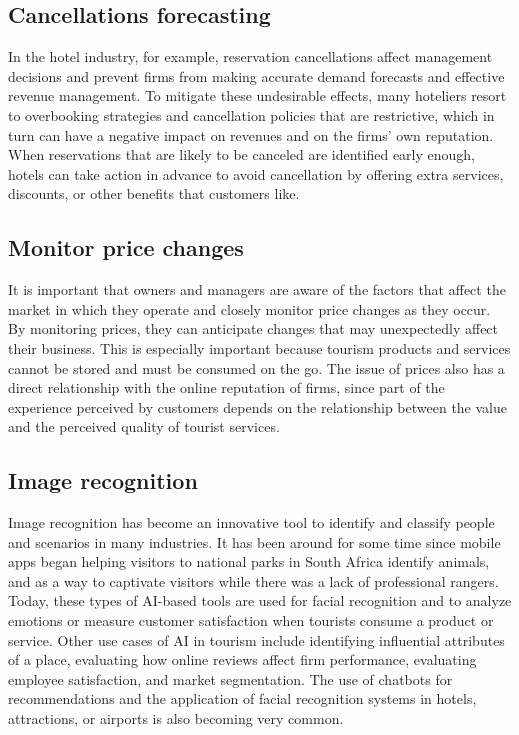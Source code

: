 \documentclass[
  letterpaper,
  DIV=11,
  numbers=noendperiod]{scrreprt}
\begin{document}
\hypertarget{cancellations-forecasting}{%
\subsection{Cancellations forecasting}\label{cancellations-forecasting}}

In the hotel industry, for example, reservation cancellations affect
management decisions and prevent firms from making accurate demand
forecasts and effective revenue management. To mitigate these
undesirable effects, many hoteliers resort to overbooking strategies and
cancellation policies that are restrictive, which in turn can have a
negative impact on revenues and on the firms' own reputation. When
reservations that are likely to be canceled are identified early enough,
hotels can take action in advance to avoid cancellation by offering
extra services, discounts, or other benefits that customers like.

\hypertarget{monitor-price-changes}{%
\subsection{Monitor price changes}\label{monitor-price-changes}}

It is important that owners and managers are aware of the factors that
affect the market in which they operate and closely monitor price
changes as they occur. By monitoring prices, they can anticipate changes
that may unexpectedly affect their business. This is especially
important because tourism products and services cannot be stored and
must be consumed on the go. The issue of prices also has a direct
relationship with the online reputation of firms, since part of the
experience perceived by customers depends on the relationship between
the value and the perceived quality of tourist services.

\hypertarget{image-recognition}{%
\subsection{Image recognition}\label{image-recognition}}

Image recognition has become an innovative tool to identify and classify
people and scenarios in many industries. It has been around for some
time since mobile apps began helping visitors to national parks in South
Africa identify animals, and as a way to captivate visitors while there
was a lack of professional rangers. Today, these types of AI-based tools
are used for facial recognition and to analyze emotions or measure
customer satisfaction when tourists consume a product or service. Other
use cases of AI in tourism include identifying influential attributes of
a place, evaluating how online reviews affect firm performance,
evaluating employee satisfaction, and market segmentation. The use of
chatbots for recommendations and the application of facial recognition
systems in hotels, attractions, or airports is also becoming very
common.
\end{document}
